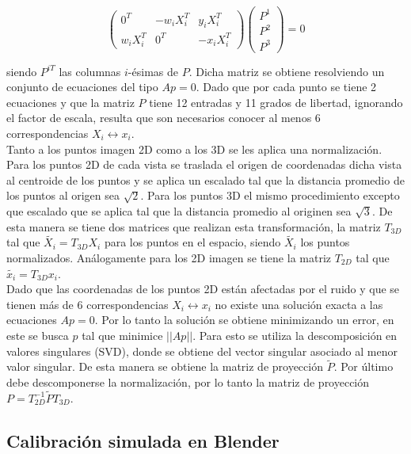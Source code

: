    \[
   \begin{pmatrix}
   0^T & -w_iX_i^T & y_iX_i^T \\
   w_iX_i^T & 0^T & -x_iX_i^T
   \end{pmatrix}
   \begin{pmatrix}
    P^1 \\
    P^2 \\
    P^3
   \end{pmatrix}
   = 0
   \]
   
 siendo $P^{iT}$ las columnas $i$-ésimas de $P$. Dicha matriz se obtiene resolviendo un conjunto de ecuaciones del tipo $Ap=0$.  Dado que por cada punto se tiene 2 ecuaciones y que la matriz $P$ tiene 12 entradas y 11 grados de libertad, ignorando el factor de escala, resulta que son necesarios conocer al menos 6 correspondencias $X_i \leftrightarrow x_i$.\\
 
 Tanto a los puntos imagen 2D como a los 3D se les aplica una normalización. Para los puntos 2D de cada vista se traslada el origen de coordenadas dicha vista al centroide de los puntos y se aplica un escalado tal que la distancia promedio de los puntos al origen sea $\sqrt{2}$. Para los puntos 3D el mismo procedimiento excepto que escalado que se aplica tal que la distancia promedio al originen sea $\sqrt{3}$. De esta manera se tiene dos matrices que realizan esta transformación, la matriz $T_{3D}$ tal que $\tilde{X_i} = T_{3D}^{}X_i$ para los puntos en el espacio, siendo $\tilde{X_i}$ los puntos normalizados. Análogamente para los 2D imagen se tiene la matriz $T_{2D}^{}$ tal que $\tilde{x_i} = T_{3D}^{}x_i$. \\
 
 Dado que las coordenadas de los puntos 2D están afectadas por el ruido y que se tienen más de 6 correspondencias $X_i \leftrightarrow x_i$ no existe una solución exacta a las ecuaciones $Ap=0$. Por lo tanto la solución se obtiene minimizando un error, en este se busca $p$ tal que minimice $||Ap||$. Para esto se utiliza la descomposición en valores singulares (SVD), donde se obtiene del vector singular asociado al menor valor singular. De esta manera se obtiene la matriz de proyección $\tilde{P}$. Por último debe descomponerse la normalización, por lo tanto la matriz de proyección $P = T_{2D}^{-1} \tilde{P} T_{3D}^{}$.
 
 \subsection{Calibración simulada en Blender}
 
